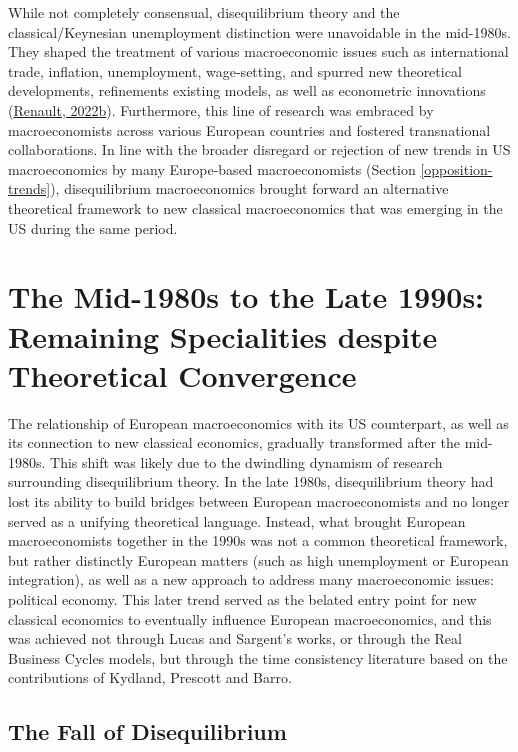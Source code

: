 \documentclass[
  12pt,
  onecolumn]{article}
\begin{document}
While not completely consensual, disequilibrium theory and the classical/Keynesian unemployment distinction were unavoidable in the mid-1980s. They shaped the treatment of various macroeconomic issues such as international trade, inflation, unemployment, wage-setting, and spurred new theoretical developments, refinements existing models, as well as econometric innovations (\protect\hyperlink{ref-renault2019}{Renault, 2022b}). Furthermore, this line of research was embraced by macroeconomists across various European countries and fostered transnational collaborations. In line with the broader disregard or rejection of new trends in US macroeconomics by many Europe-based macroeconomists (Section \ref{opposition-trends}), disequilibrium macroeconomics brought forward an alternative theoretical framework to new classical macroeconomics that was emerging in the US during the same period.

\hypertarget{period2}{%
\section{The Mid-1980s to the Late 1990s: Remaining Specialities despite Theoretical Convergence}\label{period2}}

The relationship of European macroeconomics with its US counterpart, as well as its connection to new classical economics, gradually transformed after the mid-1980s. This shift was likely due to the dwindling dynamism of research surrounding disequilibrium theory. In the late 1980s, disequilibrium theory had lost its ability to build bridges between European macroeconomists and no longer served as a unifying theoretical language. Instead, what brought European macroeconomists together in the 1990s was not a common theoretical framework, but rather distinctly European matters (such as high unemployment or European integration), as well as a new approach to address many macroeconomic issues: political economy. This later trend served as the belated entry point for new classical economics to eventually influence European macroeconomics, and this was achieved not through Lucas and Sargent's works, or through the Real Business Cycles models, but through the time consistency literature based on the contributions of Kydland, Prescott and Barro.

\hypertarget{disequilibrium-fall}{%
\subsection{The Fall of Disequilibrium}\label{disequilibrium-fall}}
\end{document}
